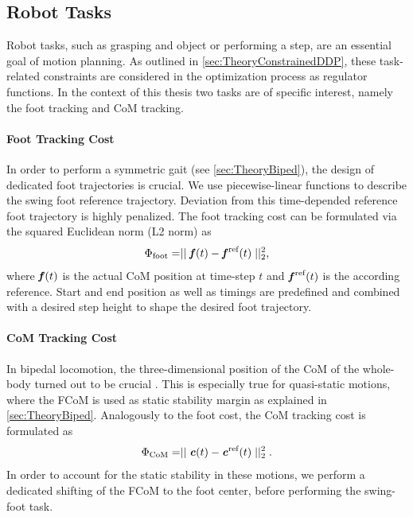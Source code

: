 \subsection{Robot Tasks}
Robot tasks, such as grasping and object or performing a step, are an essential goal of motion planning. As outlined in \cref{sec:TheoryConstrainedDDP}, these task-related constraints are considered in the optimization process as regulator functions. In the context of this thesis two tasks are of specific interest, namely the foot tracking and \gls{CoM} tracking. 

\paragraph{Foot Tracking Cost}
In order to perform a symmetric gait (see \cref{sec:TheoryBiped}), the design of dedicated foot trajectories is crucial. We use piecewise-linear functions to describe the swing foot reference trajectory. Deviation from this time-depended reference foot trajectory is highly penalized. The foot tracking cost can be formulated via the squared Euclidean norm (L2 norm) as
\begin{equation*} 
\Phi_{\text{foot}}=\mid\mid \bm{\mathit{f}}(t)-\bm{\mathit{f}}^{\text{ref}}(t)\mid\mid^2_2,
\end{equation*}
where $\bm{\mathit{f}}(t)$ is the actual \gls{CoM} position at time-step $t$ and $\bm{\mathit{f}}^\text{ref}(t)$ is the according reference. Start and end position as well as timings are predefined and combined with a desired step height to shape the desired foot trajectory. 

\paragraph{\Gls{CoM} Tracking Cost}
In bipedal locomotion, the three-dimensional position of the \gls{CoM} of the whole-body turned out to be crucial \cite{carpentier2017centre}. This is especially true for quasi-static motions, where the \gls{FCoM} is used as static stability margin as explained in \cref{sec:TheoryBiped}. Analogously to the foot cost, the \gls{CoM} tracking cost is formulated as
\begin{equation*} 
\Phi_{\text{CoM}}=\mid\mid \bm{\mathit{c}}(t)-\bm{\mathit{c}}^\text{ref}(t)\mid\mid^2_2.
\end{equation*}
In order to account for the static stability in these motions, we perform a dedicated shifting of the \gls{FCoM} to the foot center, before performing the swing-foot task. 


